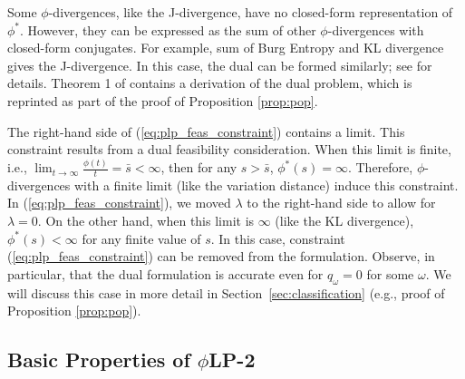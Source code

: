 \documentclass[opre,nonblindrev]{informs3} %
\newcommand{\plp}{$\phi$LP-2}
\begin{document}
Some $\phi$-divergences, like the J-divergence, have no closed-form representation of $\phi^*$. 
However, they can be expressed as the sum of other $\phi$-divergences with closed-form conjugates. 
For example, sum of Burg Entropy and KL divergence gives the J-divergence. 
In this case, the dual can be formed similarly; see \cite{bental2013robust} for details.
Theorem 1 of \cite{bental2013robust} contains a derivation of the dual problem, which is reprinted as part of the proof of Proposition \ref{prop:pop}.


The right-hand side of (\ref{eq:plp_feas_constraint}) contains a limit.
This constraint results from a dual feasibility consideration. 
When this limit is finite, i.e., $\lim_{t \rightarrow \infty} \frac{\phi(t)}{t}=  \bar{s}<\infty$, then for any $s> \bar{s}$, $\phi^*(s)=\infty$. 
Therefore, $\phi$-divergences with a finite limit (like the variation distance) induce this constraint.
In (\ref{eq:plp_feas_constraint}), we moved $\lambda$ to the right-hand side to allow for $\lambda=0$. 
On the other hand, when this limit is $\infty$ (like the KL divergence), $\phi^*(s)<\infty$ for any finite value of $s$. 
In this case, 
constraint (\ref{eq:plp_feas_constraint}) can be removed from the formulation. 
Observe, in particular, that the dual formulation is accurate even for $q_\omega = 0$ for some $\omega$.  
We will discuss this case in more detail in Section~\ref{sec:classification} (e.g., proof of  Proposition \ref{prop:pop}).



\subsection{Basic Properties of \plp}
\label{ssec:basicprop}
\end{document}
